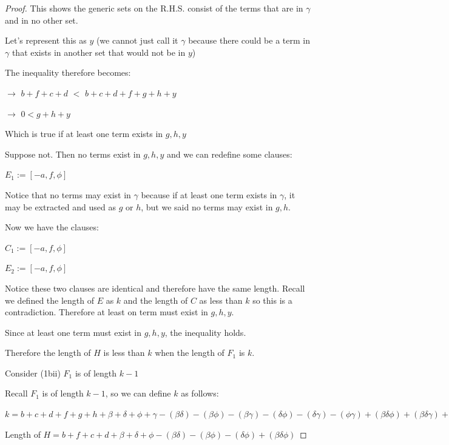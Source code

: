 \documentclass[manuscript]{acmart}
\begin{document}
\begin{proof}
        This shows the generic sets on the R.H.S. consist of the terms that
        are in $\gamma$ and in no other set. 

        Let's represent this as $y$ (we cannot just call it $\gamma$ because there could be a term in $\gamma$ that exists in another set that would not be in $y$)

        The inequality therefore becomes:

        $\rightarrow$
        $b + f + c + d$
        $<$
        $b + c + d + f + g + h 
        + y
        $

        $\rightarrow$
        $0 < g + h + y$

        Which is true if at least one term exists in {$g, h, y$}

        Suppose not. Then no terms exist in {$g, h, y$} and we can redefine some clauses:

        $E_1 := [-a, f, \phi]$

        Notice that no terms may exist in $\gamma$ because if at least one term exists in $\gamma$, it may be extracted and used as $g$ or $h$, but we said no terms may exist in {$g, h$}.

        Now we have the clauses:

        $C_1 := [-a, f, \phi]$

        $E_2 := [-a, f, \phi]$

        Notice these two clauses are identical and therefore have the same length. Recall we defined the length of $E$ as $k$ and the length of $C$ as less than $k$ so this is a contradiction. Therefore at least on term must exist in {$g, h, y$}.

        Since at least one term must exist in {$g, h, y$}, the inequality holds.

        Therefore the length of $H$ is less than $k$ when the length of $F_1$ is $k$.

        Consider (1bii) $F_1$ is of length $k-1$

        Recall $F_1$ is of length $k - 1$, so we can define $k$ as follows:

        $k = b + c + d + f + g + h 
        + \beta + \delta + \phi + \gamma
        - (\beta \delta) - (\beta \phi) - (\beta \gamma) - (\delta \phi) - (\delta \gamma) - (\phi \gamma)
        + (\beta \delta \phi) + (\beta \delta \gamma) + (\beta \phi \gamma) + (\delta \phi \gamma)
        - (\beta \delta \phi \gamma)
        + 1
        $

        Length of $H = b + f + c + d 
        + \beta + \delta + \phi
        - (\beta \delta) - (\beta \phi) - (\delta \phi)
        + (\beta \delta \phi) $


\end{proof}
\end{document}
